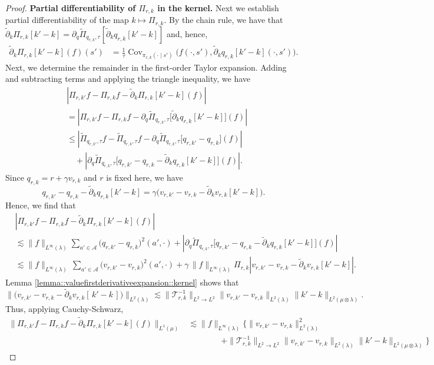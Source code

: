 \documentclass[11pt]{article}
\newcommand{\adk}{\widetilde{\partial}_k}
\theoremstyle{plain}
\begin{document}
\begin{proof}
\noindent \textbf{Partial differentiability of $\Pi_{r,k}$ in the kernel.} Next we establish partial differentiability of the map $k \mapsto \Pi_{r,k}$. By the chain rule, we have that $\adk \Pi_{r, k}[k'-k] =  \partial_q \widetilde{\Pi}_{q_{r,k},\tau}[\adk q_{r,k}[k'-k]]$ and, hence,
\begin{align*}
    \adk \Pi_{r, k}[k'-k](f)(s') &=  \frac{1}{\tau}\operatorname{Cov}_{\pi_{r, k}(\cdot \mid s')}\big(f(\cdot, s'), \adk q_{r,k}[k'-k](\cdot, s')\big) .
\end{align*} 
Next, we determine the remainder in the first-order Taylor expansion. Adding and subtracting terms and applying the triangle inequality, we have 
\begin{align*}
&\left| \Pi_{r, k'} f - \Pi_{r, k} f - \adk \Pi_{r, k}[k'-k](f) \right| \\
&= \left| \Pi_{r , k'} f - \Pi_{r, k} f - \partial_q \widetilde{\Pi}_{q_{r,k},\tau}\big[\adk q_{r,k}[k'-k]\big](f) \right| \\
&\leq \left| \widetilde{\Pi}_{q_{r , k'},\tau} f - \widetilde{\Pi}_{q_{r,k},\tau} f 
        - \partial_q \widetilde{\Pi}_{q_{r,k},\tau}\big[q_{r, k'} - q_{r,k}\big](f)\right| \\
&\quad + \left| \partial_q \widetilde{\Pi}_{q_{r,k},\tau}\big[q_{r, k'} - q_{r,k} - \adk q_{r,k}[k'-k]\big](f) \right|.
\end{align*}
Since $q_{r,k}=r+\gamma v_{r,k}$ and $r$ is fixed here, we have
\[
q_{r, k'} - q_{r,k} - \adk q_{r,k}[k'-k]
= \gamma \big(v_{r, k'} - v_{r,k} - \adk v_{r,k}[k'-k]\big).
\]
Hence, we find that 
\begin{align*}
&\left| \Pi_{r, k'} f - \Pi_{r, k} f - \adk \Pi_{r, k}[k'-k](f) \right| \\
&\lesssim \|f\|_{L^\infty(\lambda)}  \sum_{a' \in \mathcal{A}} \big(q_{r, k'} - q_{r,k}\big)^2(a' , \cdot)
   + \left| \partial_q \widetilde{\Pi}_{q_{r,k},\tau}\big[q_{r, k'} - q_{r,k} - \adk q_{r,k}[k'-k]\big](f) \right| \\
&\lesssim \|f\|_{L^\infty(\lambda)} \,\sum_{a' \in \mathcal{A}} \big(v_{r, k'} - v_{r,k}\big)^2(a' , \cdot) 
   + \gamma\,\|f\|_{L^\infty(\lambda)}  \Pi_{r,k}\left|v_{r, k'} - v_{r,k} - \adk v_{r,k}[k'-k] \right| . 
\end{align*}
Lemma \ref{lemma::valuefirstderivativeexpansion::kernel} shows that $$  \|\big(v_{r,k'} - v_{r,k} - \adk v_{r,k}[\,k' - k\,]\big)\|_{L^2(\lambda)}  \lesssim \|\mathcal{T}_{r,k}^{-1}\|_{L^2 \rightarrow L^2} \|v_{r,k'} - v_{r,k}\|_{L^2(\lambda)} \|k' - k\|_{L^2(\mu \otimes \lambda)}.$$
Thus, applying Cauchy-Schwarz,
\begin{align}
\label{eqn::boundPi_kernel}
\| \Pi_{r, k'} f - \Pi_{r, k} f - \adk \Pi_{r, k}[k'-k](f) \|_{L^1(\mu)}
&\lesssim \|f\|_{L^\infty(\lambda)} \Big\{
    \|v_{r, k'} - v_{r,k}\|_{L^2(\lambda)}^2 \\
&\qquad\qquad
    + \|\mathcal{T}_{r,k}^{-1}\|_{L^2 \rightarrow L^2}
      \|v_{r,k'} - v_{r,k}\|_{L^2(\lambda)}
      \|k' - k\|_{L^2(\mu \otimes \lambda)}
  \Big\}
\end{align}
 


\end{proof}
\end{document}
